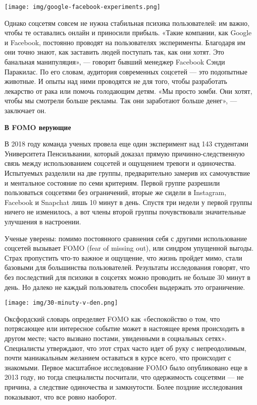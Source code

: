 \begin{center}
    \texttt{[image: img/google-facebook-experiments.png]}
\end{center}

Однако соцсетям совсем не нужна стабильная психика пользователей: им важно, чтобы те оставались онлайн и приносили прибыль. «Такие компании, как Google и Facebook, постоянно проводят на пользователях эксперименты. Благодаря им они точно знают, как заставить людей поступать так, как они хотят. Это банальная манипуляция», — говорит бывший менеджер Facebook Сэнди Паракилас. По его словам, аудитория современных соцсетей — это подопытные животные. И опыты над ними проводятся не для того, чтобы разработать лекарство от рака или помочь голодающим детям. «Мы просто зомби. Они хотят, чтобы мы смотрели больше рекламы. Так они заработают больше денег», — заключает он.

\textbf{В FOMO верующие}

В 2018 году команда ученых провела еще один эксперимент над 143 студентами Университета Пенсильвании, который доказал прямую причинно-следственную связь между использованием соцсетей и ощущением тревоги и одиночества. Испытуемых разделили на две группы, предварительно замерив их самочувствие и ментальное состояние по семи критериям. Первой группе разрешили пользоваться соцсетями без ограничений, вторые же сидели в Instagram, Facebook и Snapchat лишь 10 минут в день. Спустя три недели у первой группы ничего не изменилось, а вот члены второй группы почувствовали значительные улучшения в настроении.

Ученые уверены: помимо постоянного сравнения себя с другими использование соцсетей вызывает FOMO (fear of missing out), или синдром упущенной выгоды. Страх пропустить что-то важное и ощущение, что жизнь пройдет мимо, стали базовыми для большинства пользователей. Результаты исследования говорят, что без последствий для психики в соцсетях можно проводить не больше 30 минут в день. Но далеко не каждый пользователь способен выдержать это ограничение.

\begin{center}
    \texttt{[image: img/30-minuty-v-den.png]}
\end{center}

Оксфордский словарь определяет FOMO как «беспокойство о том, что потрясающее или интересное событие может в настоящее время происходить в другом месте; часто вызвано постами, увиденными в социальных сетях». Специалисты утверждают, что этот страх часто идет об руку с непреодолимым, почти маниакальным желанием оставаться в курсе всего, что происходит с знакомыми. Первое масштабное исследование FOMO было опубликовано еще в 2013 году, но тогда специалисты посчитали, что одержимость соцсетями — не причина, а следствие одиночества и замкнутости. Более поздние исследования показывают, что все ровно наоборот.

